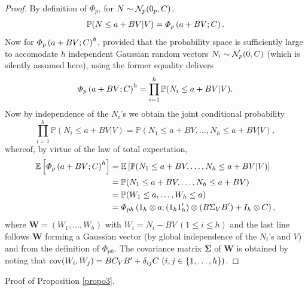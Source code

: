\documentclass[aoas]{imsart}
\begin{document}
\begin{proof}
	By definition of $\Phi_{p}$, for $N\sim \mathcal{N}_{p}(0_{p},C)$, 
	$$
	\mathbb{P}(N\leq a + BV | V)
	=
	\varPhi_{p}\left( a + BV; C \right).
	$$
	Now for $\varPhi_{p}\left( a + BV; C \right)^h$, provided that the probability space is sufficiently large to accomodate $h$ independent Gaussian random vectors $N_i\sim \mathcal{N}_{p}(0,C)$ (which is silently assumed here), using the former equality delivers 
	$$
	\varPhi_{p}\left( a + BV; C \right)^h
	=
	\prod_{i=1}^h \mathbb{P}(N_i\leq a + BV | V).
	$$
	Now by independence of the $N_i$'s we obtain the joint conditional probability 
	$$
	\prod_{i=1}^h \mathbb{P}(N_i\leq a + BV | V)
	=
	\mathbb{P}(N_1\leq a + BV, \dots, N_h\leq a + BV| V),
	$$
	whereof, by virtue of the law of total expectation, 
	\begin{equation*}
	\begin{split}
	\mathbb{E}\left[ \varPhi_{p}\left( a + BV; \covN \right)^h \right]
	&=\mathbb{E}\left[\mathbb{P}(N_1\leq a + BV, \dots, N_h\leq a + BV| V)\right]\\
	&=\mathbb{P}(N_1\leq a + BV, \dots, N_h\leq a + BV)\\
	&=\mathbb{P}(W_1 \leq a, \dots, W_h\leq a)\\
	&=\varPhi_{ph}
	\left(
	1_{h} \otimes a
	;
	(1_{h}1_{h}')\otimes (B\Sigma_{V} B') + 
	I_{h}\otimes \covN
	\right),
	\end{split}
	\end{equation*}
	where $\mathbf{W}=(W_1,\dots,W_h)$ with $W_i=N_i- BV \ (1\leq i \leq h)$
	and the last line follows $\mathbf{W}$ forming a Gaussian vector (by global independence of the $N_i$'s and $V$) and from the definition of $\varPhi_{p h}$. The covariance matrix $\mathbf{\Sigma}$ of $\mathbf{W}$ is obtained by noting that $\operatorname{cov}(W_i,W_j)=B \covV B' + \delta_{ij} \covN \ 
	(i,j \in \{1,\dots,h\})$.
\end{proof}


Proof of Proposition \ref{propo3}.
\end{document}

